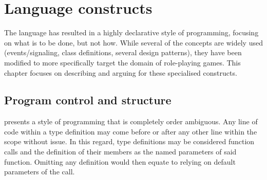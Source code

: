 \section{Language constructs}
The \langname language has resulted in a highly declarative style of programming, focusing on what is to be done, but not how. While several of the concepts are widely used (events/signaling, class definitions, several design patterns), they have been modified to more specifically target the domain of role-playing games. This chapter focuses on describing and arguing for these specialised constructs.

\subsection{Program control and structure}
\label{ref_external_rulebook}
\langname presents a style of programming that is completely order ambiguous. Any line of code within a type definition  may come before or after any other line within the scope without issue. In this regard, type definitions may be considered function calls and the definition of their members as the named parameters of said function. Omitting any definition would then equate to relying on default parameters of the call.


